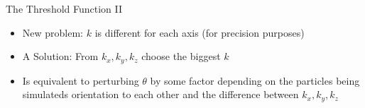 \begin{frame}{The Threshold Function II}
\begin{itemize}
    \item New problem: $k$ is different for each axis (for precision purposes)
    \item A Solution: From $k_x, k_y, k_z$ choose the biggest $k$ 
    \item Is equivalent to perturbing $\theta$ by some factor depending on the particles being simulateds orientation to each other and the difference between $k_x, k_y, k_z$ 
\end{itemize}
    
\end{frame}